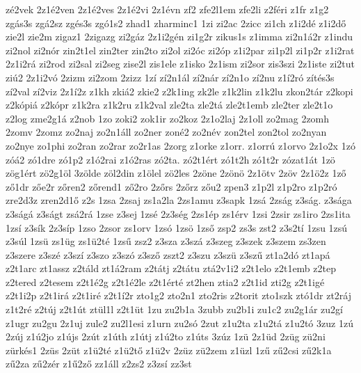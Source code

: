 {zé2vek
2z1é2ven
2z1é2ves
2z1é2vi
2z1évn
zf2
zfe2l1em
zfe2li
z2féri
z1fr
z1g2
zgás3s
zgá2sz
zgés3s
zgó1s2
zhad1
zharminc1
1zi
zi2ac
2zicc
zi1ch
z1i2dé
z1i2dő
zie2l
zie2m
zigaz1
2zigazg
zi2gáz
2z1i2gén
zi1g2r
zikus1s
z1imma
zi2n1á2r
z1indu
zi2nol
zi2nór
zin2t1el
zin2ter
zin2to
zi2ol
zi2óc
zi2óp
z1i2par
zi1p2l
zi1p2r
z1i2rat
2z1i2rá
zi2rod
zi2sal
zi2seg
zise2l
zis1ele
z1isko
2z1ism
zi2sor
zis3szi
2z1iste
zi2tut
ziú2
2z1i2vó
2zizm
zi2zom
2zizz
1zí
zí2n1ál
zí2nár
zí2n1o
zí2nu
z1í2ró
zítés3s
zí2val
zí2viz
2z1í2z
z1kh
zkiá2
zkie2
z2k1ing
zk2le
z1k2lin
z1k2lu
zkon2tár
z2kopi
z2kópiá
z2kópr
z1k2ra
z1k2ru
z1k2val
zle2ta
zle2tá
zle2t1emb
zle2ter
zle2t1o
z2log
zme2g1á
z2nob
1zo
zoki2
zok1ir
zo2koz
2z1o2laj
2z1oll
zo2mag
2zomh
2zomv
2zomz
zo2naj
zo2n1áll
zo2ner
zoné2
zo2név
zon2tel
zon2tol
zo2nyan
zo2nye
zo1phi
zo2ran
zo2rar
zo2r1as
2zorg
z1orke
z1orr.
z1orrú
z1orvo
2z1o2x
1zó
zóá2
zó1dre
zó1p2
z1ó2rai
z1ó2ras
zó2ta.
zó2t1ért
zó1t2h
zó1t2r
zózat1át
1zö
zög1ért
zö2g1öl
3zölde
zöl2din
z1ölel
zö2les
2zöne
2zönö
2z1ötv
2zöv
2z1ö2z
1ző
ző1dr
zőe2r
zőren2
zőrend1
ző2ro
2zőrs
2zőrz
zőu2
zpen3
z1p2l
z1p2ro
z1p2ró
zre2d3z
zren2d1ő
z2s
1zsa
2zsaj
zs1a2la
2zs1amu
z3sapk
1zsá
2zság
z3ság.
z3sága
z3ságá
z3ságt
zsá2rá
1zse
z3sej
1zsé
2z3ség
2zs1ép
zs1érv
1zsi
2zsir
zs1iro
2zs1ita
1zsí
z3sík
2z3síp
1zso
2zsor
zs1orv
1zsó
1zsö
1zső
zsp2
zs3s
zst2
z3s2tí
1zsu
1zsú
z3súl
1zsü
zs1üg
zs1ü2té
1zsű
zsz2
z3sza
z3szá
z3szeg
z3szek
z3szem
zs3zen
z3szere
z3szé
z3szí
z3szo
z3szó
z3sző
zszt2
z3szu
z3szü
z3szű
zt1a2dó
zt1apá
z2t1arc
zt1assz
z2táld
zt1á2ram
z2tátj
z2tátu
ztá2v1i2
z2t1elo
z2t1emb
z2tep
z2tered
z2tesem
z2t1é2g
z2t1é2le
z2t1érté
zt2hen
ztia2
z2t1id
zti2g
z2t1igé
z2t1i2p
z2t1irá
z2t1iré
z2t1í2r
zto1g2
zto2n1
zto2ris
z2torit
zto1szk
ztó1dr
zt2ráj
z1t2ré
z2túj
z2t1út
ztül1l
z2t1üt
1zu
zu2b1a
3zubb
zu2b1i
zu1c2
zu2g1ár
zu2gí
z1ugr
zu2gu
2z1uj
zule2
zu2l1esi
z1urn
zu2só
2zut
z1u2ta
z1u2tá
z1u2tó
3zuz
1zú
2zúj
z1ú2jo
z1újs
2zút
z1úth
z1útj
z1ú2to
z1úts
3zúz
1zü
2z1üd
2züg
zü2ni
zürkés1
2züs
2züt
z1ü2té
z1ü2tő
z1ü2v
2züz
zü2zem
z1üzl
1zű
zű2csi
zű2k1a
zű2za
zű2zér
z1ű2ző
zz1áll
z2zs2
z3zsí
zz3st
}
